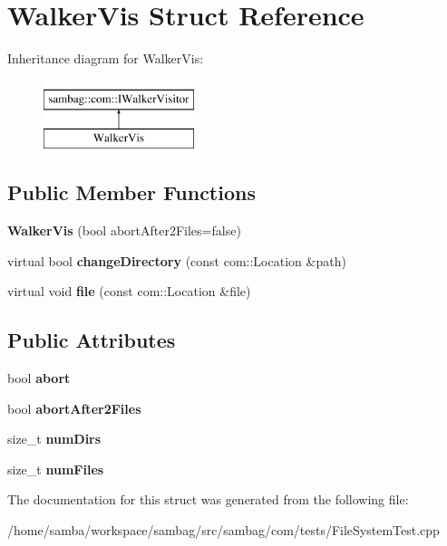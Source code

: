 \hypertarget{struct_walker_vis}{
\section{WalkerVis Struct Reference}
\label{struct_walker_vis}
}
Inheritance diagram for WalkerVis:\begin{figure}[H]
\begin{center}
\leavevmode
\includegraphics[height=2.000000cm]{struct_walker_vis}
\end{center}
\end{figure}
\subsection*{Public Member Functions}
\begin{DoxyCompactItemize}
\item 
\hypertarget{struct_walker_vis_affa19f4224fbcf2506300f996c8803ed}{
{\bfseries WalkerVis} (bool abortAfter2Files=false)}
\label{struct_walker_vis_affa19f4224fbcf2506300f996c8803ed}

\item 
\hypertarget{struct_walker_vis_a9dc5a3891b760c8a83b2c12a71394005}{
virtual bool {\bfseries changeDirectory} (const com::Location \&path)}
\label{struct_walker_vis_a9dc5a3891b760c8a83b2c12a71394005}

\item 
\hypertarget{struct_walker_vis_aabd2cfafa43384370c58532567a9ac81}{
virtual void {\bfseries file} (const com::Location \&file)}
\label{struct_walker_vis_aabd2cfafa43384370c58532567a9ac81}

\end{DoxyCompactItemize}
\subsection*{Public Attributes}
\begin{DoxyCompactItemize}
\item 
\hypertarget{struct_walker_vis_af10eed4964919114a5ef196547f25be7}{
bool {\bfseries abort}}
\label{struct_walker_vis_af10eed4964919114a5ef196547f25be7}

\item 
\hypertarget{struct_walker_vis_aec0dbb5441e122ec37ffc13e2b11a8c6}{
bool {\bfseries abortAfter2Files}}
\label{struct_walker_vis_aec0dbb5441e122ec37ffc13e2b11a8c6}

\item 
\hypertarget{struct_walker_vis_a4d74aa7568d227322ff240332ff8d07c}{
size\_\-t {\bfseries numDirs}}
\label{struct_walker_vis_a4d74aa7568d227322ff240332ff8d07c}

\item 
\hypertarget{struct_walker_vis_a17f8388f10c0fa59120f982b335a2ff8}{
size\_\-t {\bfseries numFiles}}
\label{struct_walker_vis_a17f8388f10c0fa59120f982b335a2ff8}

\end{DoxyCompactItemize}


The documentation for this struct was generated from the following file:\begin{DoxyCompactItemize}
\item 
/home/samba/workspace/sambag/src/sambag/com/tests/FileSystemTest.cpp\end{DoxyCompactItemize}
